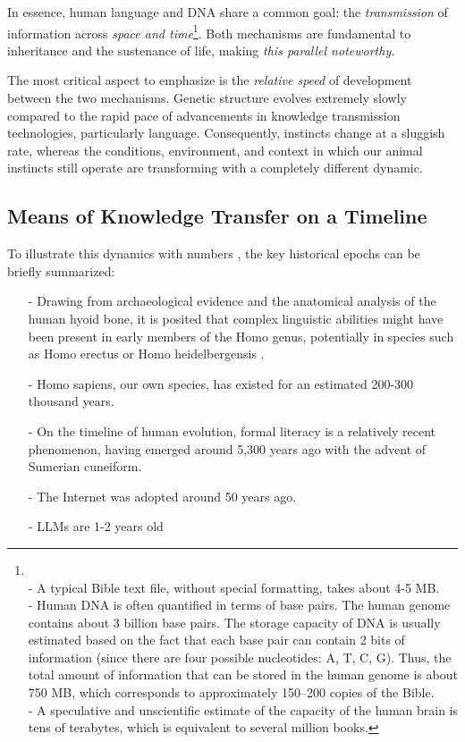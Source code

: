 \documentclass[11pt,a4]{article}
\begin{document}
    \par
    In essence, human language and DNA share a common goal: the \textit{transmission} of information across \textit{space and time}\footnote{\\- A typical Bible text file,
    without special formatting, takes about 4-5 MB. \\
    - Human DNA is often quantified in terms of base pairs.
    The human genome contains about 3 billion base pairs.
    The storage capacity of DNA is usually estimated based on the
    fact that each base pair can contain
    2 bits of information (since there are four possible nucleotides: A, T, C, G).
    Thus, the total amount of information that can be stored in the human
    genome is about 750 MB, which corresponds to approximately 150–200 copies of
    the Bible.\\
    - A speculative and unscientific estimate of the capacity
    of the human brain is tens of terabytes, which is
    equivalent to several million books.}.
    Both mechanisms are fundamental to inheritance and
    the sustenance of life, making \textit{this parallel noteworthy.}


    The most critical aspect to emphasize is the \textit{relative speed} of
    development between the two mechanisms. Genetic structure evolves extremely
    slowly compared to the rapid pace of advancements in knowledge transmission
    technologies, particularly language. Consequently, instincts change at a
    sluggish rate, whereas the conditions, environment, and context in
    which our animal instincts still operate are transforming with a
    completely different dynamic.
\subsection{Means of Knowledge Transfer on a Timeline}


    To illustrate this dynamics with numbers , the
    key historical epochs can be briefly summarized:

        \begin{itemize}
            \item[-] Drawing from archaeological evidence and the anatomical analysis of the human hyoid bone,
            it is posited that complex linguistic abilities might have been present in early members of the
            Homo genus, potentially in species such as Homo erectus or Homo heidelbergensis \cite{Capasso2008AHE}.
            \item[-] Homo sapiens, our own species, has existed for an estimated 200-300 thousand
            years\cite{Vidal}.
            \item[-] On the timeline of human evolution, formal literacy is a relatively recent
            phenomenon, having emerged around 5,300 years ago with the advent of Sumerian cuneiform\cite{Walker}.
            \item[-] The Internet was adopted around 50 years ago.
            \item[-] LLMs are 1-2 years old
        \end{itemize}
\end{document}
